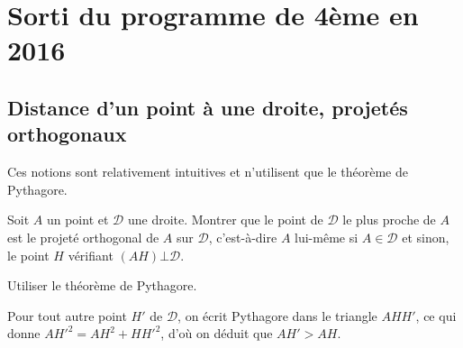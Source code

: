 \section{Sorti du programme de 4ème en 2016}



\subsection{Distance d'un point à une droite, projetés orthogonaux}

Ces notions sont relativement intuitives et n'utilisent que le théorème de Pythagore.

\begin{exo}
Soit $A$ un point et $\mathcal D$ une droite. Montrer que le point de $\mathcal D$ le plus proche de $A$ est le projeté orthogonal de $A$ sur $\mathcal D$, c'est-à-dire $A$ lui-même si $A\in \mathcal D$ et sinon, le  point $H$ vérifiant $(AH)\bot \mathcal D$.
\begin{hint} Utiliser le théorème de Pythagore.
\end{hint}
\begin{sol}
Pour tout autre point $H'$ de $\mathcal D$, on écrit Pythagore dans le triangle $AHH'$, ce qui donne $AH'^2=AH^2+HH'^2$, d'où on déduit que $AH' > AH$.
\end{sol}
\end{exo}

